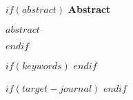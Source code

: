 
\begin{titlepage}

{\let\newpage\relax\maketitle}

\begin{singlespace}

$if(abstract)$
  \noindent\textbf{Abstract} \par
  \vskip 5pt
  \noindent $abstract$ \par
  \vskip 10pt
$endif$

$if(keywords)$
  \vskip 10pt
$endif$

$if(target-journal)$
  \vskip 10pt
$endif$

\vfill  %


\end{singlespace}

\end{titlepage}

